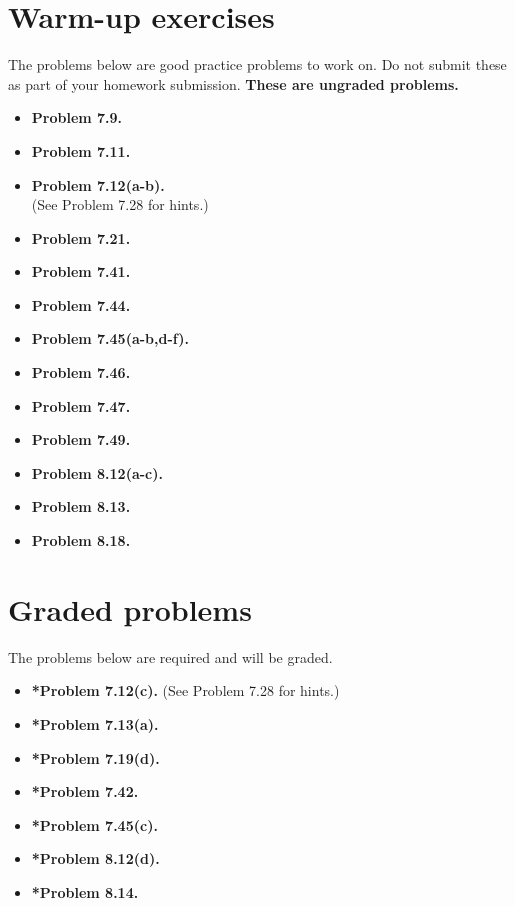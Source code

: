 \documentclass[11pt]{article}
\begin{document}
\vspace{0.2in}

\begin{center}
\end{center}

\newpage
\section*{Warm-up exercises}
The problems below are good practice problems to work on.
Do not submit these as part of your homework submission.
\textbf{These are ungraded problems.}

\begin{multicols}{2}
\begin{itemize}

\item \textbf{Problem 7.9.}
\item \textbf{Problem 7.11.}
\item \textbf{Problem 7.12(a-b).}\\(See Problem 7.28 for hints.)
\item \textbf{Problem 7.21.}
\item \textbf{Problem 7.41.}
\item \textbf{Problem 7.44.}
\item \textbf{Problem 7.45(a-b,d-f).}
\item \textbf{Problem 7.46.}
\item \textbf{Problem 7.47.}
\item \textbf{Problem 7.49.}
\item \textbf{Problem 8.12(a-c).}
\item \textbf{Problem 8.13.}
\item \textbf{Problem 8.18.}

\end{itemize}
\end{multicols}

\section*{Graded problems}
The problems below are required and will be graded.
\begin{itemize}

\item \textbf{*Problem 7.12(c).} (See Problem 7.28 for hints.)
\item \textbf{*Problem 7.13(a).}
\item \textbf{*Problem 7.19(d).}
\item \textbf{*Problem 7.42.}
\item \textbf{*Problem 7.45(c).}
\item \textbf{*Problem 8.12(d).}
\item \textbf{*Problem 8.14.}

\end{itemize}
\end{document}
